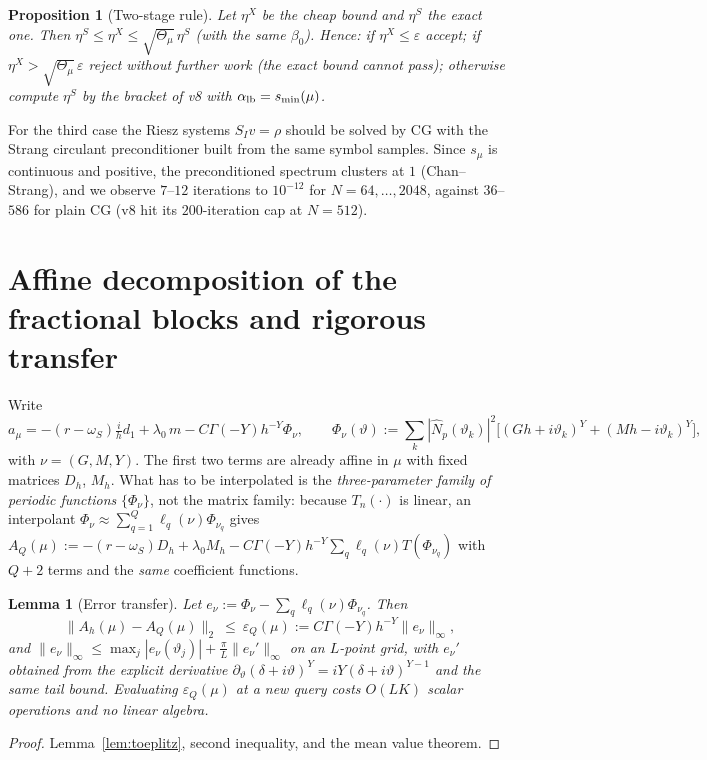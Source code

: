 \documentclass[11pt]{amsart}
\newtheorem{lemma}[theorem]{Lemma}
\newtheorem{proposition}[theorem]{Proposition}
\theoremstyle{remark}
\newcommand{\norm}[1]{\lVert #1\rVert}
\newcommand{\T}{T}
\begin{document}
\begin{proposition}[Two-stage rule]\label{prop:twostage}
Let $\eta^X$ be the cheap bound and $\eta^S$ the exact one.  Then
$\eta^S\le\eta^X\le\sqrt{\Theta_\mu}\,\eta^S$ (with the same $\beta_0$).  Hence:
if $\eta^X\le\varepsilon$ accept; if $\eta^X>\sqrt{\Theta_\mu}\,\varepsilon$
reject without further work (the exact bound cannot pass); otherwise compute
$\eta^S$ by the bracket of v8 with $\alpha_{\rm lb}=s_{\min}(\mu)$.
\end{proposition}

\noindent
For the third case the Riesz systems $S_Iv=\rho$ should be solved by CG with
the Strang circulant preconditioner built from the same symbol samples.
Since $s_\mu$ is continuous and positive, the preconditioned spectrum
clusters at $1$ (Chan--Strang), and we observe $7$--$12$ iterations to
$10^{-12}$ for $N=64,\dots,2048$, against $36$--$586$ for plain CG (v8 hit its
$200$-iteration cap at $N=512$).

\section{Affine decomposition of the fractional blocks and rigorous transfer}

Write
\begin{equation}
 a_\mu=-(r-\omega_S)\tfrac{i}{h}d_1+\lambda_0\,m-C\Gamma(-Y)h^{-Y}\Phi_{\nu},
 \qquad
 \Phi_\nu(\vartheta):=\sum_k|\widehat N_p(\vartheta_k)|^2\bigl[(Gh+i\vartheta_k)^Y+(Mh-i\vartheta_k)^Y\bigr],
 \label{eq:affine-split}
\end{equation}
with $\nu=(G,M,Y)$.  The first two terms are already affine in $\mu$ with
fixed matrices $D_h$, $M_h$.  What has to be interpolated is the
\emph{three-parameter family of periodic functions} $\{\Phi_\nu\}$, not the
matrix family: because $\T_n(\cdot)$ is linear, an interpolant
$\Phi_\nu\approx\sum_{q=1}^Q\ell_q(\nu)\Phi_{\nu_q}$ gives
$A_Q(\mu):=-(r-\omega_S)D_h+\lambda_0M_h-C\Gamma(-Y)h^{-Y}\sum_q\ell_q(\nu)\T(\Phi_{\nu_q})$
with $Q+2$ terms and the \emph{same} coefficient functions.

\begin{lemma}[Error transfer]\label{lem:eim}
Let $e_\nu:=\Phi_\nu-\sum_q\ell_q(\nu)\Phi_{\nu_q}$.  Then
\[
 \norm{A_h(\mu)-A_Q(\mu)}_2\ \le\ \varepsilon_Q(\mu):=C\Gamma(-Y)h^{-Y}\norm{e_\nu}_\infty,
\]
and $\norm{e_\nu}_\infty\le\max_{j}|e_\nu(\vartheta_j)|+\tfrac{\pi}{L}\norm{e_\nu'}_\infty$
on an $L$-point grid, with $e_\nu'$ obtained from the explicit derivative
$\partial_\vartheta(\delta+i\vartheta)^Y=iY(\delta+i\vartheta)^{Y-1}$ and the
same tail bound.  Evaluating $\varepsilon_Q(\mu)$ at a new query costs
$O(LK)$ scalar operations and no linear algebra.
\end{lemma}
\begin{proof}
Lemma~\ref{lem:toeplitz}, second inequality, and the mean value theorem.
\end{proof}
\end{document}
